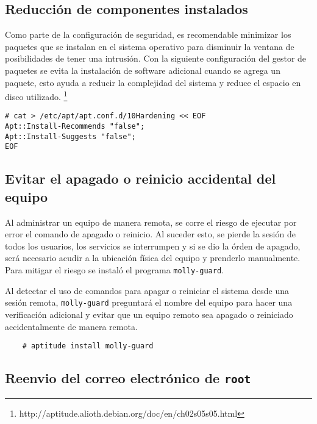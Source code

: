       \subsection {Reducci\'{o}n de componentes instalados}

Como parte de la configuraci\'{o}n de seguridad, es recomendable minimizar los paquetes que se instalan en el sistema operativo para disminuir la ventana de posibilidades de tener una intrusi\'{o}n. Con la siguiente configuraci\'{o}n del gestor de paquetes se evita la instalaci\'{o}n de software adicional cuando se agrega un paquete, esto ayuda a reducir la complejidad del sistema y reduce el espacio en disco utilizado. \footnote{http://aptitude.alioth.debian.org/doc/en/ch02s05s05.html}

{
\scriptsize
\linespread{1}
\begin{verbatim}
# cat > /etc/apt/apt.conf.d/10Hardening << EOF
Apt::Install-Recommends "false";
Apt::Install-Suggests "false";
EOF

\end{verbatim}
}

      \subsection {Evitar el apagado o reinicio accidental del equipo}

Al administrar un equipo de manera remota, se corre el riesgo de ejecutar por error el comando de apagado o reinicio. Al suceder esto, se pierde la sesi\'{o}n de todos los usuarios, los servicios se interrumpen y si se dio la \'{o}rden de apagado, ser\'{a} necesario acudir a la ubicaci\'{o}n f\'{i}sica del equipo y prenderlo manualmente. Para mitigar el riesgo se instal\'{o} el programa \texttt{molly-guard}.

Al detectar el uso de comandos para apagar o reiniciar el sistema desde una sesi\'{o}n remota, \texttt{molly-guard} preguntar\'{a} el nombre del equipo para hacer una verificaci\'{o}n adicional y evitar que un equipo remoto sea apagado o reiniciado accidentalmente de manera remota.

{
\scriptsize
\linespread{1}
\begin{verbatim}
    # aptitude install molly-guard
\end{verbatim}
}

      \subsection {Reenvio del correo electr\'{o}nico de \texttt{root}}

